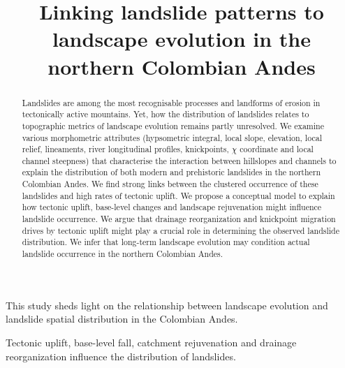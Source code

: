 \documentclass[draft]{agujournal2019}
\begin{document}
\title{Linking landslide patterns to landscape evolution in the northern Colombian Andes}




\begin{keypoints}
\item This study sheds light on the relationship between landscape evolution and landslide spatial distribution in the Colombian Andes.
\item Tectonic uplift, base-level fall, catchment rejuvenation and drainage reorganization influence the distribution of landslides.
\end{keypoints}

\begin{abstract}
Landslides are among the most recognisable processes and landforms of erosion in tectonically active mountains. Yet, how the distribution of landslides relates to topographic metrics of landscape evolution remains partly unresolved. We examine various morphometric attributes (hypsometric integral, local slope, elevation, local relief, lineaments, river longitudinal profiles, knickpoints, $\chi$ coordinate and local channel steepness) that characterise the interaction between hillslopes and channels to explain the distribution of both modern and prehistoric landslides in the northern Colombian Andes. We find strong links between the clustered occurrence of these landslides and high rates of tectonic uplift. We propose a conceptual model to explain how tectonic uplift, base-level changes and landscape rejuvenation might influence landslide occurrence. We argue that drainage reorganization and knickpoint migration drives by tectonic uplift might play a crucial role in determining the observed landslide distribution. We infer that long-term landscape evolution may condition actual landslide occurrence in the northern Colombian Andes.
\end{abstract}

\end{document}
